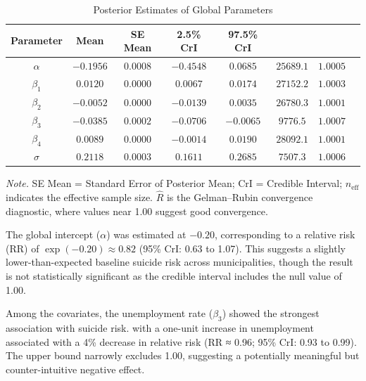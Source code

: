 \documentclass[11pt]{article}
\begin{document}
	\begin{table}[H]
		\centering
		\caption{Posterior Estimates of Global Parameters}
		\renewcommand{\arraystretch}{1.3}
		\begin{tabular}{cccccccc}
			\hline
			\textbf{Parameter} & \textbf{Mean} & \textbf{SE Mean} & \textbf{2.5\% CrI} & \textbf{97.5\% CrI} & \boldmath{$n_\text{eff}$} & \boldmath{$\hat{R}$} \\
			\hline
			$\alpha$   & $-0.1956$ & $0.0008$ & $-0.4548$ & $0.0685$ & $25689.1$ & $1.0005$ \\
			$\beta_1$  & $0.0120$  & $0.0000$ & $0.0067$  & $0.0174$ & $27152.2$ & $1.0003$ \\
			$\beta_2$  & $-0.0052$ & $0.0000$ & $-0.0139$ & $0.0035$ & $26780.3$ & $1.0001$ \\
			$\beta_3$  & $-0.0385$ & $0.0002$ & $-0.0706$ & $-0.0065$ & $9776.5$  & $1.0007$ \\
			$\beta_4$  & $0.0089$  & $0.0000$ & $-0.0014$ & $0.0190$ & $28092.1$ & $1.0001$ \\
			$\sigma$   & $0.2118$  & $0.0003$ & $0.1611$  & $0.2685$ & $7507.3$  & $1.0006$ \\
			\hline
		\end{tabular}
		
		\vspace{0.5em}
		
		\begin{minipage}{0.9\textwidth}
			\vspace{0.5em}
			\footnotesize
			\textit{Note.} SE Mean = Standard Error of Posterior Mean; CrI = Credible Interval; $n_\text{eff}$ indicates the effective sample size. $\hat{R}$ is the Gelman–Rubin convergence diagnostic, where values near 1.00 suggest good convergence.
		\end{minipage}
		\label{tab:icar_results}
	\end{table}
	
	The global intercept ($\alpha$) was estimated at $-0.20$, corresponding to a relative risk (RR) of $\exp(-0.20) \approx 0.82$ (95\% CrI: 0.63 to 1.07). This suggests a slightly lower-than-expected baseline suicide risk across municipalities, though the result is not statistically significant as the credible interval includes the null value of 1.00.
	
	Among the covariates, the unemployment rate ($\beta_3$) showed the strongest association with suicide risk. with a one-unit increase in unemployment associated with a 4\% decrease in relative risk (RR ≈ 0.96; 95\% CrI: 0.93 to 0.99). The upper bound narrowly excludes 1.00, suggesting a potentially meaningful but counter-intuitive negative effect.
	
\end{document}
